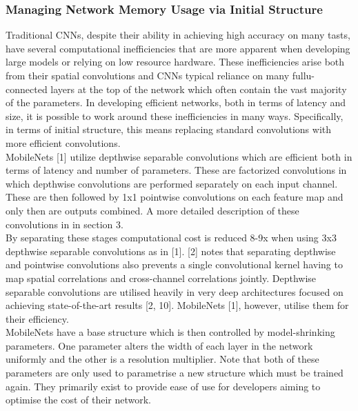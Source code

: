 \documentclass{article}
\begin{document}
\subsubsection{Managing Network Memory Usage via Initial Structure}

Traditional CNNs, despite their ability in achieving high accuracy on many tasts, have several computational inefficiencies that are more apparent when developing large models or relying on low resource hardware. These inefficiencies  arise both from their spatial convolutions and CNNs typical reliance on many fullu-connected layers at the top of the network which often contain the vast majority of the parameters. In developing efficient networks, both in terms of latency and size, it is possible to work around these inefficiencies in many ways. Specifically, in terms of initial structure, this means replacing standard convolutions with more efficient convolutions.\\

MobileNets [1] utilize depthwise separable convolutions which are efficient both in terms of latency  and number of parameters. These are factorized convolutions in which depthwise convolutions are performed separately on each input channel. These are then followed by 1x1 pointwise convolutions on each feature map and only then are outputs combined. A more detailed description of these convolutions in in section 3.\\ 

By separating these stages computational cost is reduced 8-9x when using 3x3 depthwise separable convolutions as in [1]. [2] notes that separating depthwise and pointwise convolutions also prevents a single convolutional kernel having to map spatial correlations and cross-channel correlations jointly. Depthwise separable convolutions are utilised heavily in very deep architectures focused on achieving state-of-the-art results [2, 10]. MobileNets [1], however, utilise them for their efficiency. \\

MobileNets have a base structure which is then controlled by model-shrinking parameters. One parameter alters the width of each layer in the network uniformly and the other is a resolution multiplier. Note that both of these parameters are only used to parametrise a new structure which must be trained again. They primarily exist to provide ease of use for developers aiming to optimise the cost of their network.\\
\end{document}
